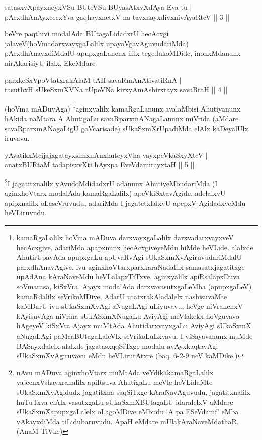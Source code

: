 \begin{shl}
satasxvXpayxneyxVSu BUteVSu BUyasAtxvXdAya Eva tu | \\
pArxdhAnAyxcecxYva gaqhayxnetxV na tavxnayxdivxnivAyaRteV \hfill ||  3 || 
\end{shl}

\begin{artha}
beVre paqthivi modalAda BUtagaLidadxrU hecAcxgi jalaveV\break (hoVmadarxvayxgaLalilx upayoVgavAguvudariMda) pArxdhAnayxdiMdalU apupxgaLanenx ililx tegedukoMDide, inonxMdanunx nirAkarisiyU ilalx, EkeMdare \mdash 
\end{artha}

\begin{shl}
parxkeSxVpoVtatxrakAlaM tAH savaRmAnAtivatiRnA | \\
tasuthxH sUkeSxmXVNa rUpeVNa kirxyAmAshirxtayx savaRtaH \hfill ||  4 || 
\end{shl}

\begin{artha}
(hoVma mADuvAga) \footnote{kamaRgaLalilx hoVma mADuva darxvayxgaLalilx darxvadarxvayxveV hecAcxgive, adariMda apapxnunx hecAcxgiveyeMdu hiMde heVLide. alalxde AhutirUpavAda apupxgaLu apUvaRvAgi sUkaSxmXvAgiruvudariMdalU parxdhAnavAgive. ivu aginxhoVtarxparxkaraNadalilx samasatxjagatitxge upAdAna kAraNaveMdu heVLalapxTiTxve. aginxyalilx apiRsalapxDuva soVmarasa, kiSxVra, Ajayx modalAda darxvavasutxgaLeMba (apupxgaLeV) kamaRdalilx seVrikoMDive, AdarU utatxrakAladalelx nashisuvaMte kaMDarU ivu sUkaSxmXvAgi aNugaLAgi uLiyuvavu, heVge niVranenxV kAyisuvAga niVrina sUkASxmXNugaLu AviyAgi meVlakekx hoVguvavo hAgeyeV kiSxVra Ajayx muMtAda AhutidarxvayxgaLu AviyAgi sUkaSxmX aNugaLAgi paMcaBUtagaLaleVlx seVrikoLuLxvavu. I viSayavanunx muMde BASayxdalelx alalxde jagatasxqqSiTxge modalu avAyxkaqtavAgi sUkaSxmXvAgiruvavu eMdu heVLirutAtxre (baq. 6-2-9 neV kaMDike.)}aginxyalilx kamaRgaLanunx avalaMbisi Ahutiyanunx hAkida naMtara A AhutigaLu savaRparxmANagaLanunx miVrida (aMdare savaRparxmANagaLigU goVcarisade) sUkaSxmX\-\break rUpadiMda elAlx kaDeyalUlx iruvavu.
\end{artha}


\begin{shl}
yAvatikxMcijajxgatayxsimxnAnxhuteyxVha vayxpeVkaSxyXteV | \\
anatxBURtaM tadapisxvXti hAyxpa EveVdamitayxtaH \hfill ||  5 || 
\end{shl}

\begin{artha}
\footnote{nAvu mADuva aginxhoVtarx muMtAda veYdikakamaRgaLalilx yajecnxVshavxranalilx apiRsuva AhutigaLu meVle heVLidaMte sUkaSxmXvAgidudx jagatitxna saqSiTxge kAraNavAguvudu, jagatitxnalilx huTuTxva elAlx vasutxgaLu sUkaSxmXBUtagaLU idaralelxV aMdare sUkaSxmXapupxgaLalelx oLagoMDive eMbudu `A pa ESeVdamf' eMba vAkayxdiMda tiLidubaruvudu. ApaH eMdare mUlakAraNaveMdathaR. (AnaM-TiVke)}I jagatitxnalilx yAvudoMdidadxrU adanunx AhutiyeMbudariMda (I aginxhoVtarx modalAda kamaRgaLalilx) apeVkiSxtavAgide. adelalxvU apipxnalilx oLaseVruvudu, adariMda I jagatetxlalxvU apepxV AgidadxveMdu heVLiruvudu.
\end{artha}

